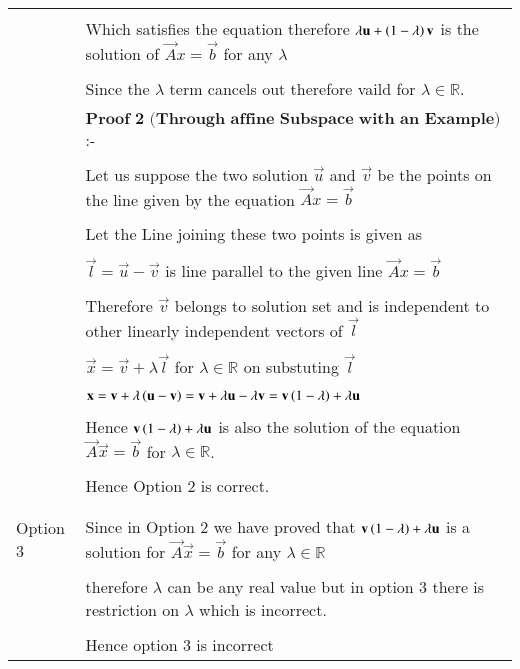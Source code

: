 \begin{longtable}{|l|l|}
&\\
&Which satisfies the equation therefore $\lambda \mathbf{u}  +\left(1-\lambda\right)\mathbf{v}$ is the solution of $\vec{A}x=\vec{b}$ for any $\lambda$\\
&\\
&Since the $\lambda$ term cancels out therefore vaild for $\lambda\in\mathbb{R}$.\\
&\\
&$\textbf{Proof 2 (Through affine Subspace with an Example)}$:-\\
&\\
&Let us suppose the two solution $\vec{u}$ and $\vec{v}$ be the points on the line given by the equation $\vec{A}x=\vec{b}$\\
&\\
&Let the Line joining these two points is given as\\
&\\
&$\vec{l}=\vec{u}-\vec{v}$ is line parallel to the given line $\vec{A}x=\vec{b}$\\
&\\
&Therefore $\vec{v}$ belongs to solution set and is independent to other linearly independent vectors of $\vec{l}$\\
&\\
&$\vec{x}=\vec{v}+\lambda\vec{l}$ for $\lambda\in\mathbb{R}$ on substuting $\vec{l}$\\
&\\
&$\mathbf{x}=\mathbf{v}+\lambda\left(\mathbf{u}-\mathbf{v}\right)=\mathbf{v}+\lambda\mathbf{u}-\lambda\mathbf{v}=\mathbf{v}\left(1-\lambda\right)+\lambda\mathbf{u}$\\
&\\
&Hence $\mathbf{v}\left(1-\lambda\right)+\lambda\mathbf{u}$ is also the solution of the equation $\vec{A}\vec{x}=\vec{b}$ for $\lambda\in\mathbb{R}$.\\
&\\
&Hence Option 2 is correct.\\
&\\
\hline
&\\
Option 3 &Since in Option 2 we have proved that $\mathbf{v}\left(1-\lambda\right)+\lambda\mathbf{u}$  is a solution for $\vec{A}\vec{x}=\vec{b}$  for any $\lambda\in\mathbb{R}$\\
&\\
&therefore $\lambda$ can be any real value but in option 3 there is restriction on $\lambda$ which is incorrect.\\
&\\
&Hence option 3 is incorrect\\
\hline

\end{longtable}
